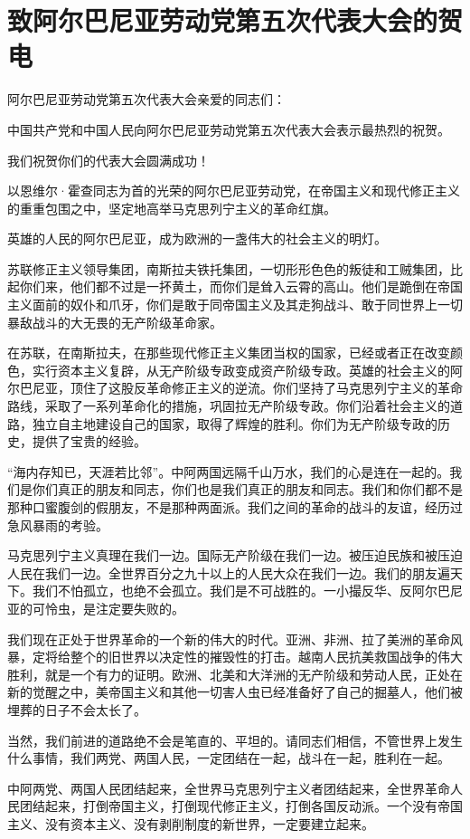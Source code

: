 \section[致阿尔巴尼亚劳动党第五次代表大会的贺电（一九六六年十月二十五日）]{致阿尔巴尼亚劳动党第五次代表大会的贺电}


阿尔巴尼亚劳动党第五次代表大会亲爱的同志们：

中国共产党和中国人民向阿尔巴尼亚劳动党第五次代表大会表示最热烈的祝贺。

我们祝贺你们的代表大会圆满成功！

以恩维尔·霍查同志为首的光荣的阿尔巴尼亚劳动党，在帝国主义和现代修正主义的重重包围之中，坚定地高举马克思列宁主义的革命红旗。

英雄的人民的阿尔巴尼亚，成为欧洲的一盏伟大的社会主义的明灯。

苏联修正主义领导集团，南斯拉夫铁托集团，一切形形色色的叛徒和工贼集团，比起你们来，他们都不过是一抔黄土，而你们是耸入云霄的高山。他们是跪倒在帝国主义面前的奴仆和爪牙，你们是敢于同帝国主义及其走狗战斗、敢于同世界上一切暴敌战斗的大无畏的无产阶级革命家。

在苏联，在南斯拉夫，在那些现代修正主义集团当权的国家，已经或者正在改变颜色，实行资本主义复辟，从无产阶级专政变成资产阶级专政。英雄的社会主义的阿尔巴尼亚，顶住了这股反革命修正主义的逆流。你们坚持了马克思列宁主义的革命路线，采取了一系列革命化的措施，巩固拉无产阶级专政。你们沿着社会主义的道路，独立自主地建设自己的国家，取得了辉煌的胜利。你们为无产阶级专政的历史，提供了宝贵的经验。

“海内存知已，天涯若比邻”。中阿两国远隔千山万水，我们的心是连在一起的。我们是你们真正的朋友和同志，你们也是我们真正的朋友和同志。我们和你们都不是那种口蜜腹剑的假朋友，不是那种两面派。我们之间的革命的战斗的友谊，经历过急风暴雨的考验。

马克思列宁主义真理在我们一边。国际无产阶级在我们一边。被压迫民族和被压迫人民在我们一边。全世界百分之九十以上的人民大众在我们一边。我们的朋友遍天下。我们不怕孤立，也绝不会孤立。我们是不可战胜的。一小撮反华、反阿尔巴尼亚的可怜虫，是注定要失败的。

我们现在正处于世界革命的一个新的伟大的时代。亚洲、非洲、拉了美洲的革命风暴，定将给整个的旧世界以决定性的摧毁性的打击。越南人民抗美救国战争的伟大胜利，就是一个有力的证明。欧洲、北美和大洋洲的无产阶级和劳动人民，正处在新的觉醒之中，美帝国主义和其他一切害人虫已经准备好了自己的掘墓人，他们被埋葬的日子不会太长了。

当然，我们前进的道路绝不会是笔直的、平坦的。请同志们相信，不管世界上发生什么事情，我们两党、两国人民，一定团结在一起，战斗在一起，胜利在一起。

中阿两党、两国人民团结起来，全世界马克思列宁主义者团结起来，全世界革命人民团结起来，打倒帝国主义，打倒现代修正主义，打倒各国反动派。一个没有帝国主义、没有资本主义、没有剥削制度的新世界，一定要建立起来。


